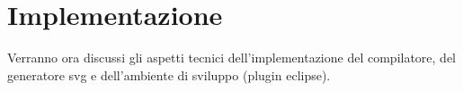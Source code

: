 \chapter{Implementazione}

Verranno ora discussi gli aspetti tecnici dell'implementazione del compilatore,
del generatore svg e dell'ambiente di sviluppo (plugin eclipse).
